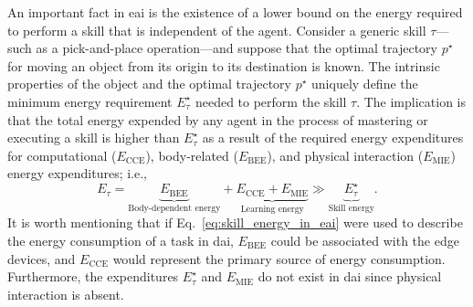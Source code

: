 \documentclass[12pt]{article}
\newcommand\myhl[1]{\textcolor{blue}{#1}}
\begin{document}
An important fact in \ac{eai} is the existence of a lower bound on the energy required to perform a skill that is independent of the agent. Consider a generic skill $\tau$---such as a pick-and-place operation---and suppose that the optimal trajectory $p^\star$ for moving an object from its origin to its destination is known. The intrinsic properties of the object and the optimal trajectory $p^\star$ uniquely define the minimum energy requirement $E^\star_{\tau}$ needed to perform the skill $\tau$. The implication is that the total energy expended by any agent in the process of mastering or executing a skill is higher than $E^\star_{\tau}$ as a result of the required energy expenditures for computational ($E_\text{CCE}$), body-related ($E_\text{BEE}$), and physical interaction ($E_\text{MIE}$) energy expenditures; i.e.,
\begin{equation}\label{eq:skill_energy_in_eai}
	E_{\tau} =  \underbrace{E_\text{BEE}}_{\text{Body-dependent energy}} + \underbrace{E_\text{CCE} + E_\text{MIE}}_{\text{Learning energy}} \gg \underbrace{E^\star_{\tau}}_{\text{Skill energy}} .
\end{equation}
It is worth mentioning that if Eq.~\eqref{eq:skill_energy_in_eai} were used to describe the energy consumption of a task in \ac{dai}, $E_\text{BEE}$ could be associated with the edge devices, and $E_\text{CCE}$ would represent the primary source of energy consumption. Furthermore, the expenditures $E^\star_{\tau}$ and $E_\text{MIE}$ do not exist in \ac{dai} since physical interaction is absent.



\end{document}

